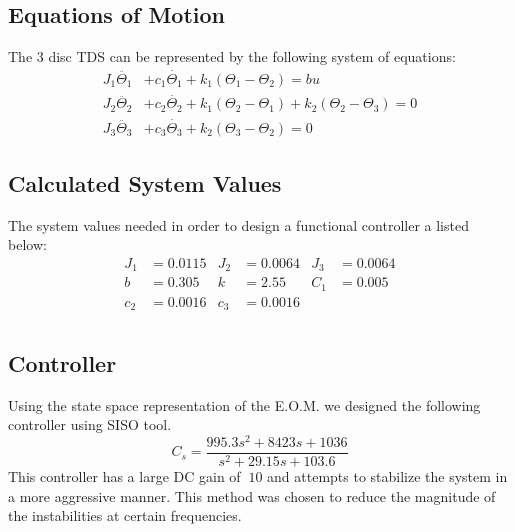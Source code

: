 \documentclass[11pt,titlepage]{article}
\begin{document}
    \subsection{Equations of Motion}
        The 3 disc TDS can be represented by the following system of equations:
        \begin{align}
            J_1\ddot{\Theta_1} &+ c_1\dot{\Theta_1} + k_1(\Theta_1 - \Theta_2) = bu \\
            J_2\ddot{\Theta_2} &+ c_2\dot{\Theta_2} + k_1(\Theta_2 - \Theta_1) + k_2(\Theta_2-\Theta_3) = 0 \\
            J_3\ddot{\Theta_3} &+ c_3\dot{\Theta_3} + k_2(\Theta_3 - \Theta_2) = 0
        \end{align}
    \subsection{Calculated System Values}
        The system values needed in order to design a functional controller a listed below:
        \begin{align}
            J_1 &=0.0115     &       J_2 &= 0.0064       &   J_3 &= 0.0064  \\
            b &= 0.305       &       k &= 2.55           &   C_1 &= 0.005   \\
            c_2 &= 0.0016    &       c_3 &= 0.0016       &       &          \\
        \end{align}
    \subsection{Controller}
        Using the state space representation of the E.O.M. we designed the following controller using SISO tool.
        \begin{equation}
            C_s = \frac{995.3 s^2 + 8423 s + 1036}{s^2 + 29.15 s + 103.6}
        \end{equation}
        This controller has a large DC gain of $~10$ and attempts to stabilize the system in a more aggressive manner. This method was chosen to reduce the magnitude of the instabilities at certain frequencies.
\end{document}
